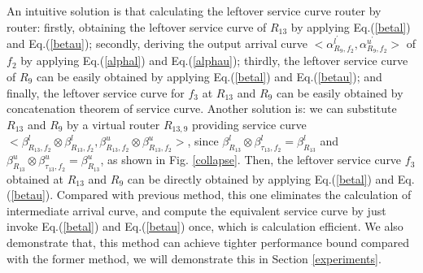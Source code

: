 \documentclass[10pt,journal]{IEEEtran}
\begin{document}
An intuitive solution is that calculating the leftover service curve router by router: firstly, obtaining the leftover service curve of $R_{13}$ by applying Eq.(\ref{betal}) and Eq.(\ref{betau}); secondly, deriving the output arrival curve $<\alpha_{R_{9},f_2}^{l^\prime},\alpha_{R_{9},f_2}^{u^\prime}>$ of $f_2$ by applying Eq.(\ref{alphal}) and Eq.(\ref{alphau}); thirdly, the leftover service curve of $R_9$ can be easily obtained by applying Eq.(\ref{betal}) and Eq.(\ref{betau}); and finally, the leftover service curve for $f_3$ at $R_{13}$ and $R_9$ can be easily obtained by concatenation theorem of service curve. Another solution is: we can substitute $R_{13}$ and $R_{9}$ by a virtual router $R_{13,9}$ providing service curve $<\beta_{R_{13},f_2}^l\otimes\beta_{R_{13},f_2}^l,\beta_{R_{13},f_2}^u\otimes\beta_{R_{13},f_2}^u>$, since $\beta_{R_{13}}^l\otimes\beta_{\tau_{13},f_2}^l=\beta_{R_{13}}^l$ and $\beta_{R_{13}}^u\otimes\beta_{\tau_{13},f_2}^u=\beta_{R_{13}}^u$, as shown in Fig. \ref{collapse}. Then, the leftover service curve $f_3$ obtained at $R_{13}$ and $R_{9}$ can be directly obtained by applying Eq.(\ref{betal}) and Eq.(\ref{betau}). Compared with previous method, this one eliminates the calculation of intermediate arrival curve, and compute the equivalent service curve by just invoke Eq.(\ref{betal}) and Eq.(\ref{betau}) once, which is calculation efficient. We also demonstrate that, this method can achieve tighter performance bound compared with the former method, we will demonstrate this in Section \ref{experiments}.
\end{document}
